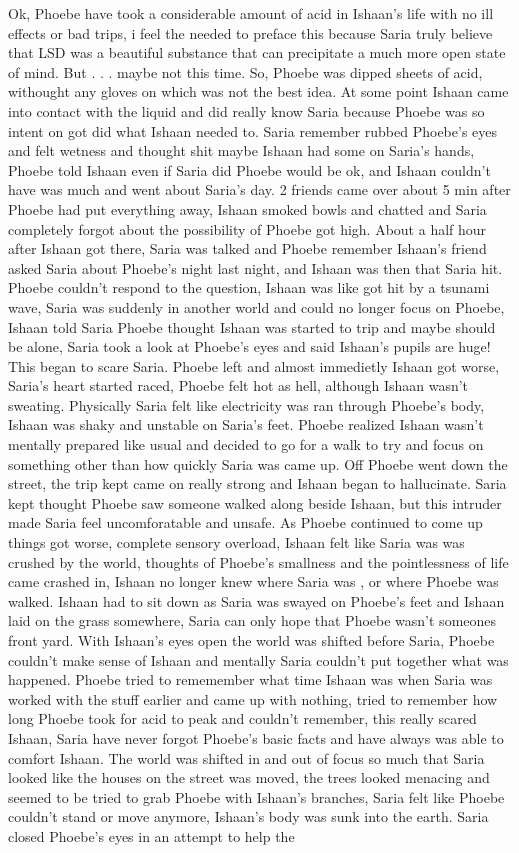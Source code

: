 \documentclass[12pt]{book}
\begin{document}
Ok, Phoebe have took a considerable amount of acid in Ishaan's life with no ill effects or bad trips, i feel the needed to preface this because Saria truly believe that LSD was a beautiful substance that can precipitate a much more open state of mind. But . . .  maybe not this time. So, Phoebe was dipped sheets of acid, withought any gloves on which was not the best idea. At some point Ishaan came into contact with the liquid and did really know Saria because Phoebe was so intent on got did what Ishaan needed to. Saria remember rubbed Phoebe's eyes and felt wetness and thought shit maybe Ishaan had some on Saria's hands, Phoebe told Ishaan even if Saria did Phoebe would be ok, and Ishaan couldn't have was much and went about Saria's day. 2 friends came over about 5 min after Phoebe had put everything away, Ishaan smoked bowls and chatted and Saria completely forgot about the possibility of Phoebe got high. About a half hour after Ishaan got there, Saria was talked and Phoebe remember Ishaan's friend asked Saria about Phoebe's night last night, and Ishaan was then that Saria hit. Phoebe couldn't respond to the question, Ishaan was like got hit by a tsunami wave, Saria was suddenly in another world and could no longer focus on Phoebe, Ishaan told Saria Phoebe thought Ishaan was started to trip and maybe should be alone, Saria took a look at Phoebe's eyes and said Ishaan's pupils are huge! This began to scare Saria. Phoebe left and almost immedietly Ishaan got worse, Saria's heart started raced, Phoebe felt hot as hell, although Ishaan wasn't sweating. Physically Saria felt like electricity was ran through Phoebe's body, Ishaan was shaky and unstable on Saria's feet. Phoebe realized Ishaan wasn't mentally prepared like usual and decided to go for a walk to try and focus on something other than how quickly Saria was came up. Off Phoebe went down the street, the trip kept came on really strong and Ishaan began to hallucinate. Saria kept thought Phoebe saw someone walked along beside Ishaan, but this intruder made Saria feel uncomforatable and unsafe. As Phoebe continued to come up things got worse, complete sensory overload, Ishaan felt like Saria was was crushed by the world, thoughts of Phoebe's smallness and the pointlessness of life came crashed in, Ishaan no longer knew where Saria was , or where Phoebe was walked. Ishaan had to sit down as Saria was swayed on Phoebe's feet and Ishaan laid on the grass somewhere, Saria can only hope that Phoebe wasn't someones front yard. With Ishaan's eyes open the world was shifted before Saria, Phoebe couldn't make sense of Ishaan and mentally Saria couldn't put together what was happened. Phoebe tried to rememember what time Ishaan was when Saria was worked with the stuff earlier and came up with nothing, tried to remember how long Phoebe took for acid to peak and couldn't remember, this really scared Ishaan, Saria have never forgot Phoebe's basic facts and have always was able to comfort Ishaan. The world was shifted in and out of focus so much that Saria looked like the houses on the street was moved, the trees looked menacing and seemed to be tried to grab Phoebe with Ishaan's branches, Saria felt like Phoebe couldn't stand or move anymore, Ishaan's body was sunk into the earth. Saria closed Phoebe's eyes in an attempt to help the 
\end{document}
